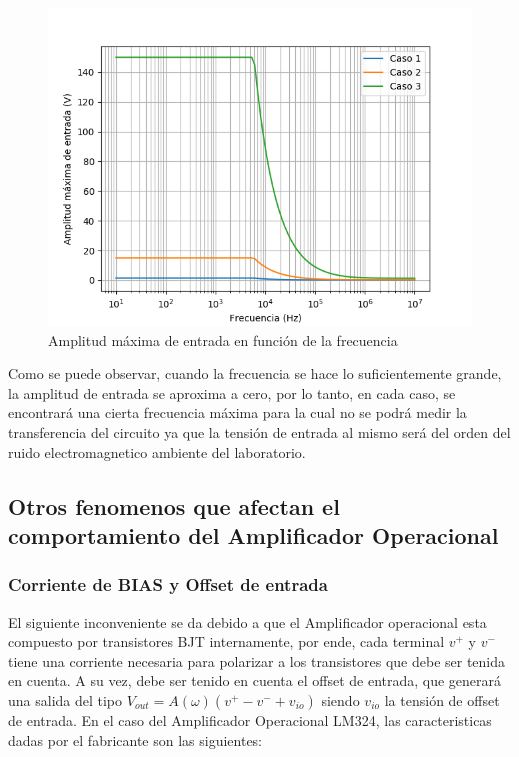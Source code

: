 \begin{figure}[H]
\begin{centering}
\includegraphics[scale=0.5]{../Ex1/iA/Resources1a/AmplMaxVsFreq123}
\par\end{centering}
\caption{Amplitud máxima de entrada en función de la frecuencia}

\end{figure}

Como se puede observar, cuando la frecuencia se hace lo suficientemente
grande, la amplitud de entrada se aproxima a cero, por lo tanto, en
cada caso, se encontrará una cierta frecuencia máxima para la cual
no se podrá medir la transferencia del circuito ya que la tensión
de entrada al mismo será del orden del ruido electromagnetico ambiente
del laboratorio.

\subsection{Otros fenomenos que afectan el comportamiento del Amplificador Operacional}

\subsubsection{Corriente de BIAS y Offset de entrada}

El siguiente inconveniente se da debido a que el Amplificador operacional
esta compuesto por transistores BJT internamente, por ende, cada terminal
$v^{+}$ y $v^{-}$ tiene una corriente necesaria para polarizar a
los transistores que debe ser tenida en cuenta. A su vez, debe ser
tenido en cuenta el offset de entrada, que generará una salida del
tipo $V_{out}=A(\omega)\left(v^{+}-v^{-}+v_{io}\right)$ siendo $v_{io}$
la tensión de offset de entrada. En el caso del Amplificador Operacional
LM324, las caracteristicas dadas por el fabricante son las siguientes:

